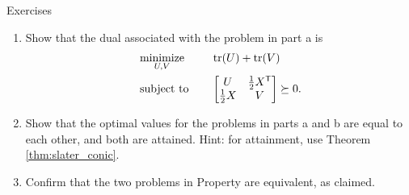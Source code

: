 \begin{xcb}{Exercises}
\begin{enumerate}[label=\thechapter.\arabic*]
\begin{enumerate}[label=\alph*.]
\item Show that the dual associated with the problem in part a is 
  \begin{alignat*}{2}
  &\operatorname*{minimize}_{U,V} \quad && \operatorname{tr}(U) + \operatorname{tr}(V) \\
  &\operatorname{subject\,\,to} \quad && \begin{bmatrix} U & \frac{1}{2} X^{\mathsf{T}} \\  
    \frac{1}{2} X & V \end{bmatrix} \succeq 0.
  \end{alignat*}

\item Show that the optimal values for the problems in parts a and b are equal
  to each other, and both are attained. Hint: for attainment, use Theorem
  \ref{thm:slater_conic}.   

\item Confirm that the two problems in Property
   are equivalent, as claimed.
\end{enumerate}
\end{enumerate}
\end{xcb}

